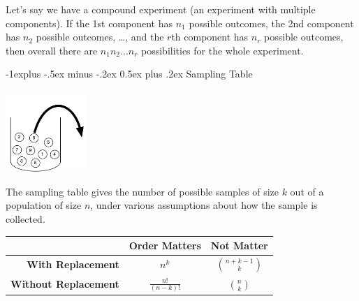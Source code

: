 \documentclass[10pt,landscape]{article}
\makeatletter
\renewcommand{\subsection}{\@startsection{subsection}{2}{0mm}%
                                {-1explus -.5ex minus -.2ex}%
                                {0.5ex plus .2ex}%
                                {\normalfont\normalsize\bfseries}}
\makeatother
\begin{document}
\begin{multicols*}{3}
 Let's say we have a compound experiment (an experiment with multiple components). If the 1st component has $n_1$ possible outcomes, the 2nd component has $n_2$ possible outcomes, \dots, and the $r$th component has $n_r$ possible outcomes, then overall there are $n_1n_2 \dots n_r$ possibilities for the whole experiment.
 
\subsection{Sampling Table}
   \begin{minipage}{\linewidth}
            \centering
             \includegraphics[width=1.2in]{figures/jar.pdf}
        \end{minipage}
    The sampling table gives the number of possible samples of size $k$ out of a population of size $n$, under various assumptions about how the sample is collected. 
        \begin{center}
                \setlength{\extrarowheight}{7pt}
            \begin{tabular}{r|cc}
                 & \textbf{Order Matters} & \textbf{Not Matter} \\ \hline
                \textbf{With Replacement} & $\displaystyle n^k$ & $\displaystyle{n+k-1 \choose k}$ \\
                \textbf{Without Replacement} & $\displaystyle\frac{n!}{(n - k)!}$ & $\displaystyle{n \choose k}$
            \end{tabular}
        \end{center}

\end{multicols*}
\end{document}
